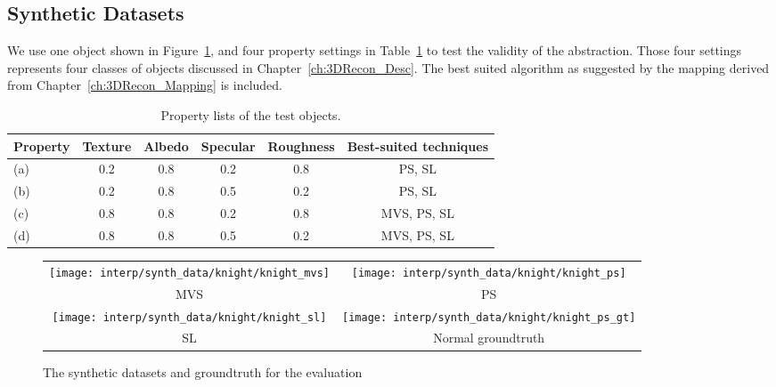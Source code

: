 \subsection{Synthetic Datasets}
We use one object shown in Figure~\ref{fig:synth_data}, and four property settings in Table~\ref{tab:prop_list_synth_data} to test the validity of the abstraction. Those four settings represents four classes of objects discussed in Chapter~\ref{ch:3DRecon_Desc}. The best suited algorithm as suggested by the mapping derived from Chapter~\ref{ch:3DRecon_Mapping} is included.
\begin{table}[!ht]
  \centering
  \begin{tabular}{l*{5}{c}}
  \hline
  \textbf{Property} & Texture & Albedo & Specular & Roughness & Best-suited techniques\\
  \hline
  (a) & 0.2 & 0.8 & 0.2 & 0.8 & PS, SL\\
  (b) & 0.2 & 0.8 & 0.5 & 0.2 & PS, SL\\
  (c) & 0.8 & 0.8 & 0.2 & 0.8 & MVS, PS, SL\\
  (d) & 0.8 & 0.8 & 0.5 & 0.2 & MVS, PS, SL\\
  \hline
  \end{tabular}
  \caption{Property lists of the test objects.}
  \label{tab:prop_list_synth_data}
\end{table}

\begin{figure}[!htbp]
\centering
\begin{tabular}{cc}
  \texttt{[image: interp/synth\_data/knight/knight\_mvs]}&
  \texttt{[image: interp/synth\_data/knight/knight\_ps]}\\
  MVS & PS\\
  \texttt{[image: interp/synth\_data/knight/knight\_sl]}&
  \texttt{[image: interp/synth\_data/knight/knight\_ps\_gt]}\\
  SL & Normal groundtruth\\
\end{tabular}
\caption{The synthetic datasets and groundtruth for the evaluation}
\label{fig:synth_data}
\end{figure}


